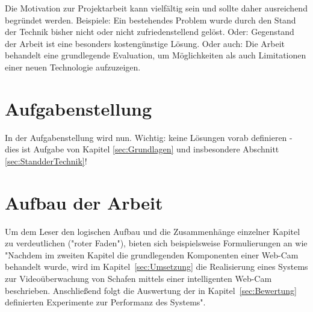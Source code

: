 Die Motivation zur Projektarbeit kann vielfältig sein und sollte daher ausreichend begründet werden. Beispiele: Ein bestehendes Problem wurde durch den Stand der Technik bisher nicht oder nicht zufriedenstellend gelöst. Oder: Gegenstand der Arbeit ist eine besonders kostengünstige Lösung. Oder auch: Die Arbeit behandelt eine grundlegende Evaluation, um Möglichkeiten als auch Limitationen einer neuen Technologie aufzuzeigen.

\section{Aufgabenstellung}
\label{sec:Aufgabe}

In der Aufgabenstellung wird nun. Wichtig: keine Lösungen vorab definieren - dies ist Aufgabe von Kapitel \ref{sec:Grundlagen} und insbesondere Abschnitt \ref{sec:StandderTechnik}!

\section{Aufbau der Arbeit}
\label{sec:Aufbau}

Um dem Leser den logischen Aufbau und die Zusammenhänge einzelner Kapitel zu verdeutlichen ("roter Faden"), bieten sich beispielsweise Formulierungen an wie "Nachdem im zweiten Kapitel die grundlegenden Komponenten einer Web-Cam behandelt wurde, wird im Kapitel~\ref{sec:Umsetzung} die Realisierung eines Systems zur Videoüberwachung von Schafen mittels einer intelligenten Web-Cam beschrieben. Anschließend folgt die Auswertung der in Kapitel~\ref{sec:Bewertung} definierten Experimente zur Performanz des Systems".


